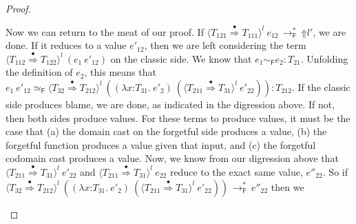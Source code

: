\documentclass[9pt]{extarticle}
\newcommand{\ottnt}[1]{\mathit{#1}}
\begin{document}
{\begin{lemma}
\begin{proof}
{\begin{itemize}
\begin{itemize}
        Now we can return to the meat of our proof. If
        $ \langle  \ottnt{T_{{\mathrm{121}}}}  \mathord{ \overset{\bullet}{\Rightarrow} }  \ottnt{T_{{\mathrm{111}}}}  \rangle^{ \ottnt{l} } ~  \ottnt{e_{{\mathrm{12}}}}  \,  \longrightarrow ^{*}_{  \mathsf{F}  }  \,  \mathord{\Uparrow}  \ottnt{l'} $, we are done. If it
        reduces to a value $\ottnt{e'_{{\mathrm{12}}}}$, then we are left considering
        the term $ \langle  \ottnt{T_{{\mathrm{112}}}}  \mathord{ \overset{\bullet}{\Rightarrow} }  \ottnt{T_{{\mathrm{122}}}}  \rangle^{ \ottnt{l} } ~   (  \ottnt{e_{{\mathrm{1}}}} ~ \ottnt{e'_{{\mathrm{12}}}}  )  $ on the classic side. We
        know that $ \ottnt{e_{{\mathrm{1}}}}   \sim _{  \mathsf{F}  }  \ottnt{e_{{\mathrm{2}}}}  :  \ottnt{T_{{\mathrm{21}}}} $. Unfolding the definition of
        $\ottnt{e_{{\mathrm{2}}}}$, this means that $  \ottnt{e_{{\mathrm{1}}}} ~ \ottnt{e'_{{\mathrm{12}}}}    \simeq _{  \mathsf{F}  }   \langle  \ottnt{T_{{\mathrm{32}}}}  \mathord{ \overset{\bullet}{\Rightarrow} }  \ottnt{T_{{\mathrm{212}}}}  \rangle^{ \ottnt{l} } ~   (   (  \lambda \mathit{x} \mathord{:} \ottnt{T_{{\mathrm{31}}}} .~  \ottnt{e'_{{\mathrm{2}}}}  )  ~  (  \langle  \ottnt{T_{{\mathrm{211}}}}  \mathord{ \overset{\bullet}{\Rightarrow} }  \ottnt{T_{{\mathrm{31}}}}  \rangle^{ \ottnt{l} } ~  \ottnt{e'_{{\mathrm{22}}}}  )   )    :  \ottnt{T_{{\mathrm{212}}}} $.
If the classic side produces blame, we are done, as indicated
        in the digression above. If not, then both sides produce
        values. For these terms to produce values, it must be the case
        that (a) the domain cast on the forgetful side produces a
        value, (b) the forgetful function produces a value given that
        input, and (c) the forgetful codomain cast produces a
        value. Now, we know from our digression above that
        $ \langle  \ottnt{T_{{\mathrm{211}}}}  \mathord{ \overset{\bullet}{\Rightarrow} }  \ottnt{T_{{\mathrm{31}}}}  \rangle^{ \ottnt{l} } ~  \ottnt{e'_{{\mathrm{22}}}} $ and $ \langle  \ottnt{T_{{\mathrm{211}}}}  \mathord{ \overset{\bullet}{\Rightarrow} }  \ottnt{T_{{\mathrm{31}}}}  \rangle^{ \ottnt{l} } ~  \ottnt{e_{{\mathrm{22}}}} $ reduce to
        the exact same value, $\ottnt{e''_{{\mathrm{22}}}}$. So if $ \langle  \ottnt{T_{{\mathrm{32}}}}  \mathord{ \overset{\bullet}{\Rightarrow} }  \ottnt{T_{{\mathrm{212}}}}  \rangle^{ \ottnt{l} } ~   (   (  \lambda \mathit{x} \mathord{:} \ottnt{T_{{\mathrm{31}}}} .~  \ottnt{e'_{{\mathrm{2}}}}  )  ~  (  \langle  \ottnt{T_{{\mathrm{211}}}}  \mathord{ \overset{\bullet}{\Rightarrow} }  \ottnt{T_{{\mathrm{31}}}}  \rangle^{ \ottnt{l} } ~  \ottnt{e'_{{\mathrm{22}}}}  )   )   \,  \longrightarrow ^{*}_{  \mathsf{F}  }  \, \ottnt{e''_{{\mathrm{22}}}}$ then we

\end{itemize}
\end{itemize}}
\end{proof}
\end{lemma}}
\end{document}
